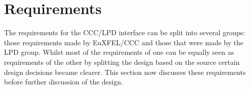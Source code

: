 % 
% 
% 

\section{Requirements} %
\label{sec:requirements}
The requirements for the CCC/LPD interface can be split into several groups: those requirements made by EuXFEL/CCC and those that were made by the LPD group. Whilst most of the requirements of one can be equally seen as requirements of the other by splitting the design based on the source certain design decisions became clearer. This section now discusses these requirements before further discussion of the design.

